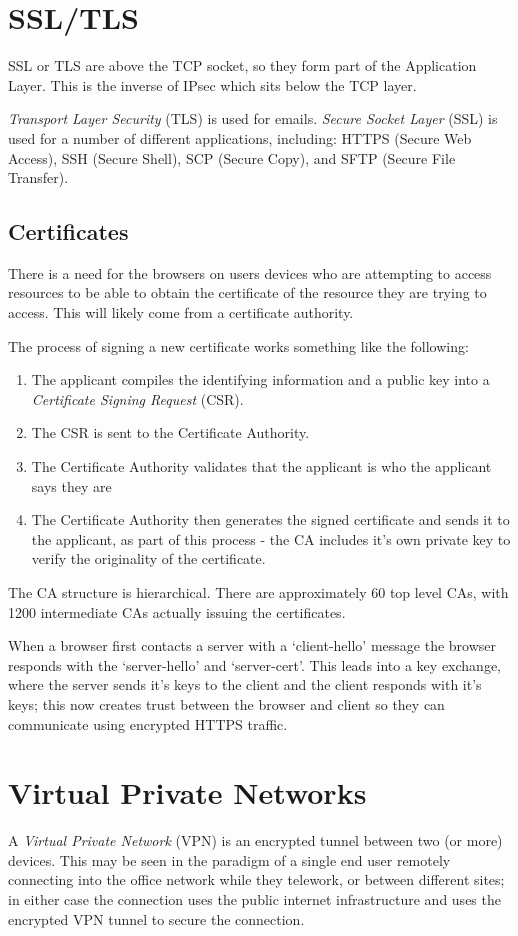 \section{SSL/TLS}
SSL or TLS are above the TCP socket, so they form part of the Application Layer. This is the inverse of IPsec which sits below the TCP layer.

\textit{Transport Layer Security} (TLS) is used for emails. \textit{Secure Socket Layer} (SSL) is used for a number of different applications, including: HTTPS (Secure Web Access), SSH (Secure Shell), SCP (Secure Copy), and SFTP (Secure File Transfer).

\subsection{Certificates}
There is a need for the browsers on users devices who are attempting to access resources to be able to obtain the certificate of the resource they are trying to access. This will likely come from a certificate authority.

The process of signing a new certificate works something like the following:
\begin{enumerate}
    \item The applicant compiles the identifying information and a public key into a \textit{Certificate Signing Request} (CSR).
    \item The CSR is sent to the Certificate Authority.
    \item The Certificate Authority validates that the applicant is who the applicant says they are
    \item The Certificate Authority then generates the signed certificate and sends it to the applicant, as part of this process - the CA includes it's own private key to verify the originality of the certificate.
\end{enumerate}

The CA structure is hierarchical. There are approximately 60 top level CAs, with 1200 intermediate CAs actually issuing the certificates. 

When a browser first contacts a server with a `client-hello' message the browser responds with the `server-hello' and `server-cert'. This leads into a key exchange, where the server sends it's keys to the client and the client responds with it's keys; this now creates trust between the browser and client so they can communicate using encrypted HTTPS traffic.


\section{Virtual Private Networks}
A \textit{Virtual Private Network} (VPN) is an encrypted tunnel between two (or more) devices. This may be seen in the paradigm of a single end user remotely connecting into the office network while they telework, or between different sites; in either case the connection uses the public internet infrastructure and uses the encrypted VPN tunnel to secure the connection. 

